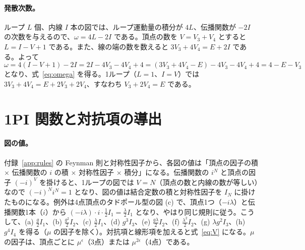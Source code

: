 \documentclass[a4paper,10pt]{ltjsarticle}
\begin{document}
\paragraph{発散次数。}ループ $L$ 個、内線 $I$ 本の図では、ループ運動量の積分が $4L$、伝播関数が $-2I$ の次数を与えるので、$\omega=4L-2I$ である。頂点の数を $V=V_3+V_4$ とすると $L=I-V+1$ である。また、線の端の数を数えると $3V_3+4V_4=E+2I$ である。よって
\begin{equation*}
\omega=4(I-V+1)-2I=2I-4V_3-4V_4+4=(3V_3+4V_4-E)-4V_3-4V_4+4=4-E-V_3
\end{equation*}
となり、式~\eqref{eq:omega} を得る。1ループ（$L=1$、$I=V$）では $3V_3+4V_4=E+2V_3+2V_4$、すなわち $V_3+2V_4=E$ である。

\section{1PI 関数と対抗項の導出}\label{app:ren}

\paragraph{図の値。}付録~\ref{app:rules} の Feynman 則と対称性因子から、各図の値は「頂点の因子の積 $\times$ 伝播関数の $i$ の積 $\times$ 対称性因子 $\times$ 積分」になる。伝播関数の $i^N$ と頂点の因子 $(-i)^{V}$ を掛けると、1ループの図では $V=N$（頂点の数と内線の数が等しい）なので $(-i)^N i^N=1$ となり、図の値は結合定数の積と対称性因子を $I_N$ に掛けたものになる。例外は4点頂点のタドポール型の図 (c) で、頂点1つ（$-i\lambda$）と伝播関数1本（$i$）から $(-i\lambda)\cdot i\cdot\frac12I_1=\frac\lambda2I_1$ となり、やはり同じ規則に従う。こうして、(a) $\frac g2I_1$、(b) $\frac{g^2}2I_2$、(c) $\frac\lambda2I_1$、(d) $g^3I_3$、(e) $\frac{g\lambda}2I_2$、(f) $\frac{\lambda^2}2I_2$、(g) $\lambda g^2I_3$、(h) $g^4I_4$ を得る（$\mu$ の因子を除く）。対抗項と線形項を加えると式~\eqref{eq:V} になる。$\mu$ の因子は、頂点ごとに $\mu^\epsilon$（3点）または $\mu^{2\epsilon}$（4点）である。
\end{document}
